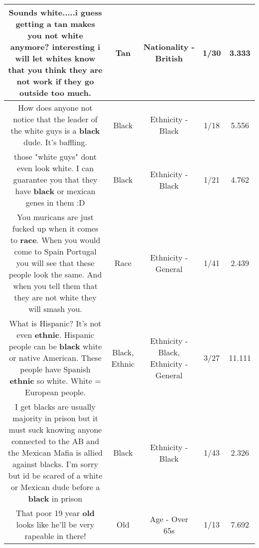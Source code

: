 \documentclass[11pt]{article}
\newlength\mylength
\begin{document}
\begin{center}
\begin{longtable}{|C{.65\mylength}|C{.30\mylength}|C{.12\mylength}|C{.12\mylength}|C{.12\mylength}|}
  \small Sounds white.....i guess getting a \textbf{tan} makes you not white anymore?  interesting i will let whites know that you think they are not work if they go outside too much.\normalsize   & Tan & Nationality - British & 1/30 & 3.333 \\  \hline
  \small How does anyone not notice that the leader of the white guys is a \textbf{black} dude. It's baffling.\normalsize   & Black & Ethnicity - Black & 1/18 & 5.556 \\  \hline
  \small those "white guys" dont even look white. I can guarantee you that they have \textbf{black} or mexican genes in them :D\normalsize   & Black & Ethnicity - Black & 1/21 & 4.762 \\  \hline
  \small You muricans are just fucked up when it comes to \textbf{race}. When you would come to Spain Portugal you will see that these people look the same. And when you tell them that they are not white they will smash you.\normalsize   & Race & Ethnicity - General & 1/41 & 2.439 \\  \hline
  \small What is Hispanic? It's not even \textbf{ethnic}. Hispanic people can be \textbf{black} white or native American. These people have Spanish \textbf{ethnic} so white. White = European people.\normalsize   & Black, Ethnic & Ethnicity - Black, Ethnicity - General & 3/27 & 11.111 \\  \hline
  \small I get blacks are usually majority in prison but it must suck knowing anyone connected to the AB and the Mexican Mafia is allied against blacks. I'm sorry but id be scared of a white or Mexican dude before a \textbf{black} in prison\normalsize   & Black & Ethnicity - Black & 1/43 & 2.326 \\  \hline
  \small That poor 19 year \textbf{old} looks like he'll be very rapeable in there!\normalsize   & Old & Age - Over 65s & 1/13 & 7.692 \\  \hline

\end{longtable}
\end{center}
\end{document}
